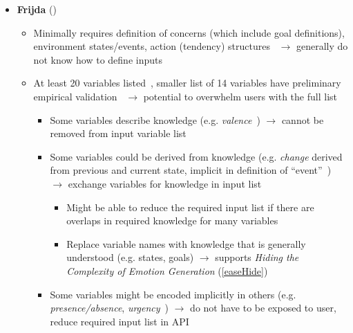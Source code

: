 \begin{itemize}
    \item \textbf{Frijda} (\good)
    \begin{itemize}
        \item Minimally requires definition of concerns (which include goal
        definitions), environment states/events, action (tendency)
        structures~\citep[p.~454, 457]{frijda1986emotions} $\rightarrow$
        generally do not know how to define
        inputs~\citep[p.~86--87]{roseman2001model}

        \item At least 20 variables
        listed~\citep[p.~205--216]{frijda1986emotions}, smaller list of 14
        variables have preliminary empirical
        validation~\citep[p.~128--131]{frijda1987emotion} $\rightarrow$
        potential to overwhelm users with the full list
        \begin{itemize}
            \item Some variables describe knowledge (e.g.
            \textit{valence}~\citep[p.~207]{frijda1986emotions}) $\rightarrow$
            cannot be removed from input variable list

            \item Some variables could be derived from knowledge (e.g.
            \textit{change} derived from previous and current state, implicit
            in definition of ``event''~\citep[p.~209--210]{frijda1986emotions})
            $\rightarrow$ exchange variables for knowledge in input list
            \begin{itemize}
                \item Might be able to reduce the required input list if there
                are overlaps in required knowledge for many variables

                \item Replace variable names with knowledge that is generally
                understood (e.g. states, goals) $\rightarrow$ supports
                \textit{Hiding the Complexity of Emotion Generation}
                (\ref{easeHide})
            \end{itemize}

            \item Some variables might be encoded implicitly in others (e.g.
            \textit{presence/absence}, \textit{urgency}~\citep[p.~208--209,
            455]{frijda1986emotions}) $\rightarrow$ do not have to be exposed
            to user, reduce required input list in API


\end{itemize}
\end{itemize}
\end{itemize}
